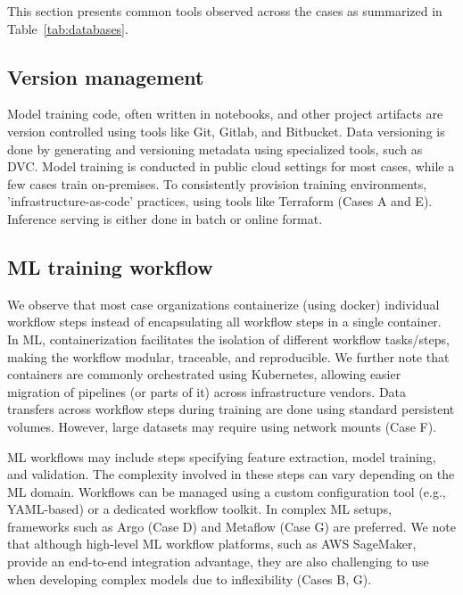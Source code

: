This section presents common tools observed across the cases as summarized in Table~\ref{tab:databases}.



\subsection{Version management}
Model training code, often written in notebooks, and other project artifacts are version controlled using tools like Git, Gitlab, and Bitbucket. Data versioning is done by generating and versioning metadata using specialized tools, such as DVC. 
Model training is conducted in public cloud settings for most cases, while a few cases train on-premises. To consistently provision training environments, 'infrastructure-as-code' practices, using tools like Terraform (Cases A and E). Inference serving is either done in batch or online format.


\subsection{ML training workflow}
We observe that most case organizations containerize (using docker) individual workflow steps instead of encapsulating all workflow steps in a single container. In ML, containerization facilitates the isolation of different workflow tasks/steps, making the workflow modular, traceable, and reproducible. We further note that containers are commonly orchestrated using Kubernetes, allowing easier migration of pipelines (or parts of it) across infrastructure vendors. Data transfers across workflow steps during training are done using standard persistent volumes. However, large datasets may require using network mounts (Case F).

ML workflows may include steps specifying feature extraction, model training, and validation. The complexity involved in these steps can vary depending on the ML domain. Workflows can be managed using a custom configuration tool (e.g., YAML-based) or a dedicated workflow toolkit. In complex ML setups, frameworks such as Argo (Case D) and Metaflow (Case G) are preferred. We note that although high-level ML workflow platforms, such as AWS SageMaker, provide an end-to-end integration advantage, they are also challenging to use when developing complex models due to inflexibility (Cases B, G).


